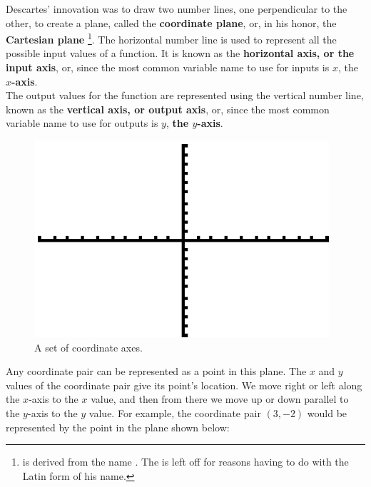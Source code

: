 Descartes’ innovation was to draw two number lines, one perpendicular to the other, to create a plane, called the \textbf{coordinate plane}, or, in his honor, the \textbf{Cartesian plane} \footnote{ is derived from the name . The  is left off for reasons having to do with the Latin form of his name.}. The horizontal number line is used to represent all the possible input values of a function. It is known as the \textbf{horizontal axis, or the input axis}, or, since the most common variable name to use for inputs is $x$, the \textbf{$x$-axis}.\\

The output values for the function are represented using the vertical number line, known as the \textbf{vertical axis, or output axis}, or, since the most common variable name to use for outputs is $y$, \textbf{the $y$-axis}.

\begin{figure}[H]
	\centering
	\includegraphics[scale=1.0]{Sections/FunctionsandGraphsImages/Figure03.png}
	\caption{A set of coordinate axes.}
\end{figure}

Any coordinate pair can be represented as a point in this plane. The $x$ and $y$ values of the coordinate pair give its point’s location. We move right or left along the $x$-axis to the $x$ value, and then from there we move up or down parallel to the $y$-axis to the $y$ value. For example, the coordinate pair $(3, -2)$ would be represented by the point in the plane shown below:

